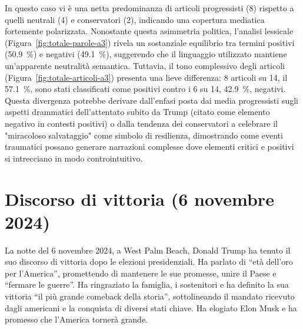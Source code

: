 In questo caso vi è una netta predominanza di articoli progressisti (8) rispetto a quelli neutrali (4) e conservatori (2), indicando una copertura mediatica fortemente polarizzata. Nonostante questa asimmetria politica, l'analisi lessicale (Figura~\ref{fig:totale-parole-a3}) rivela un sostanziale equilibrio tra termini positivi (\SI{50.9}{\percent}) e negativi (\SI{49.1}{\percent}), suggerendo che il linguaggio utilizzato mantiene un'apparente neutralità semantica. Tuttavia, il tono complessivo degli articoli (Figura~\ref{fig:totale-articoli-a3}) presenta una lieve differenza: 8 articoli su 14, il \SI{57.1}{\percent}, sono stati classificati come positivi contro i 6 su 14, \SI{42.9}{\percent}, negativi. Questa divergenza potrebbe derivare dall'enfasi posta dai media progressisti sugli aspetti drammatici dell'attentato subito da Trump (citato come elemento negativo in contesti positivi) o dalla tendenza dei conservatori a celebrare il "miracoloso salvataggio" come simbolo di resilienza, dimostrando come eventi traumatici possano generare narrazioni complesse dove elementi critici e positivi si intrecciano in modo controintuitivo.

\newpage
\section{Discorso di vittoria (6 novembre 2024)}

La notte del 6 novembre 2024, a West Palm Beach, Donald Trump ha tenuto il suo discorso di vittoria dopo le elezioni presidenziali.
Ha parlato di “età dell’oro per l’America”, promettendo di mantenere le sue promesse, unire il Paese e “fermare le guerre”.
Ha ringraziato la famiglia, i sostenitori e ha definito la sua vittoria “il più grande comeback della storia”, sottolineando il mandato ricevuto dagli americani e la conquista di diversi stati chiave.
Ha elogiato Elon Musk e ha promesso che l’America tornerà grande. \\

